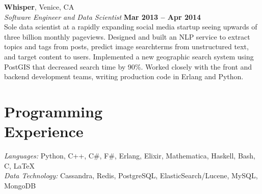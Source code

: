 \documentclass[margin,line]{resume}
\begin{document}
\begin{resume}
    \textbf{Whisper}, Venice, CA \vspace{2mm}\\\vspace{1mm}%
    \textsl{Software Engineer and Data Scientist} \hfill \textbf{Mar 2013 -- Apr 2014}\\
    Sole data scientist at a rapidly expanding social media startup
    seeing upwards of three billion monthly pageviews. Designed and built an NLP
    service to extract topics and tags from posts, predict image searchterms
    from unstructured text, and target content to users. Implemented a new
    geographic search system using PostGIS that decreased search time by
    90\%. Worked closely with the front and backend development teams, writing
    production code in Erlang and Python.


    \section{\mysidestyle Programming\\Experience}

    \emph{Languages:} Python, C++, C\#, F\#, Erlang, Elixir, Mathematica, Haskell, Bash, C, \LaTeX \\
    \emph{Data Technology:} Cassandra, Redis, PostgreSQL, ElasticSearch/Lucene, MySQL, MongoDB
\end{resume}
\end{document}
